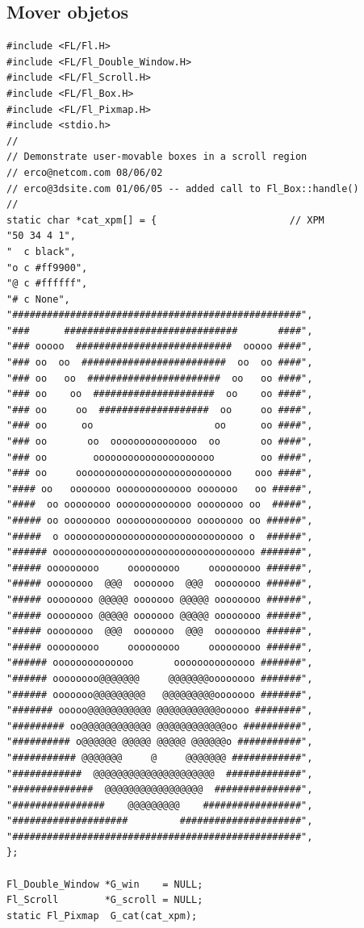 \documentclass[10pt, oneside]{article}   	%
\begin{document}
\subsection{Mover objetos}
\begin{lstlisting}
#include <FL/Fl.H>
#include <FL/Fl_Double_Window.H>
#include <FL/Fl_Scroll.H>
#include <FL/Fl_Box.H>
#include <FL/Fl_Pixmap.H>
#include <stdio.h>
//
// Demonstrate user-movable boxes in a scroll region
// erco@netcom.com 08/06/02
// erco@3dsite.com 01/06/05 -- added call to Fl_Box::handle()
//
static char *cat_xpm[] = {                       // XPM
"50 34 4 1",
"  c black",
"o c #ff9900",
"@ c #ffffff",
"# c None",
"##################################################",
"###      ##############################       ####",
"### ooooo  ###########################  ooooo ####",
"### oo  oo  #########################  oo  oo ####",
"### oo   oo  #######################  oo   oo ####",
"### oo    oo  #####################  oo    oo ####",
"### oo     oo  ###################  oo     oo ####",
"### oo      oo                     oo      oo ####",
"### oo       oo  ooooooooooooooo  oo       oo ####",
"### oo        ooooooooooooooooooooo        oo ####",
"### oo     ooooooooooooooooooooooooooo    ooo ####",
"#### oo   ooooooo ooooooooooooo ooooooo   oo #####",
"####  oo oooooooo ooooooooooooo oooooooo oo  #####",
"##### oo oooooooo ooooooooooooo oooooooo oo ######",
"#####  o ooooooooooooooooooooooooooooooo o  ######",
"###### ooooooooooooooooooooooooooooooooooo #######",
"##### ooooooooo     ooooooooo     ooooooooo ######",
"##### oooooooo  @@@  ooooooo  @@@  oooooooo ######",
"##### oooooooo @@@@@ ooooooo @@@@@ oooooooo ######",
"##### oooooooo @@@@@ ooooooo @@@@@ oooooooo ######",
"##### oooooooo  @@@  ooooooo  @@@  oooooooo ######",
"##### ooooooooo     ooooooooo     ooooooooo ######",
"###### oooooooooooooo       oooooooooooooo #######",
"###### oooooooo@@@@@@@     @@@@@@@oooooooo #######",
"###### ooooooo@@@@@@@@@   @@@@@@@@@ooooooo #######",
"####### ooooo@@@@@@@@@@@ @@@@@@@@@@@ooooo ########",
"######### oo@@@@@@@@@@@@ @@@@@@@@@@@@oo ##########",
"########## o@@@@@@ @@@@@ @@@@@ @@@@@@o ###########",
"########### @@@@@@@     @     @@@@@@@ ############",
"############  @@@@@@@@@@@@@@@@@@@@@  #############",
"##############  @@@@@@@@@@@@@@@@@  ###############",
"################    @@@@@@@@@    #################",
"####################         #####################",
"##################################################",
};

Fl_Double_Window *G_win    = NULL;
Fl_Scroll        *G_scroll = NULL;
static Fl_Pixmap  G_cat(cat_xpm);


\end{lstlisting}
\end{document}
